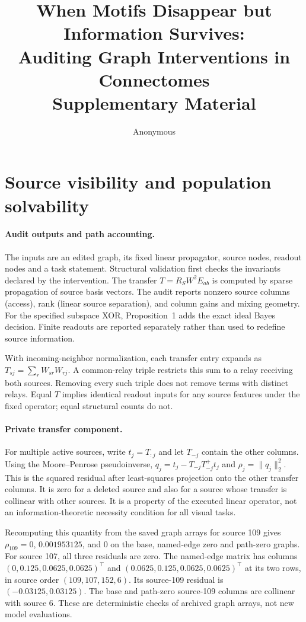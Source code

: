 \documentclass[10pt,letterpaper]{article}
\title{When Motifs Disappear but Information Survives:\\Auditing Graph Interventions in Connectomes\\\large Supplementary Material}
\author{Anonymous}
\date{}
\begin{document}
\maketitle

\section{Source visibility and population solvability}

\paragraph{Audit outputs and path accounting.}
The inputs are an edited graph, its fixed linear propagator, source nodes,
readout nodes and a task statement. Structural validation first checks the
invariants declared by the intervention. The transfer $T=R_SW^2E_{ab}$ is
computed by sparse propagation of source basis vectors. The audit reports
nonzero source columns (access), rank (linear source separation), and
column gains and mixing geometry. For the specified subspace XOR,
Proposition~1 adds the exact ideal Bayes decision. Finite readouts are
reported separately rather than used to redefine source information.

With incoming-neighbor normalization, each transfer entry expands as
$T_{sj}=\sum_r W_{sr}W_{rj}$. A common-relay triple restricts this sum
to a relay receiving both sources. Removing every such triple does not
remove terms with distinct relays. Equal $T$ implies identical readout
inputs for any source features under the fixed operator; equal structural
counts do not.

\paragraph{Private transfer component.}
For multiple active sources, write $t_j=T_{:j}$ and let $T_{-j}$ contain
the other columns. Using the Moore--Penrose pseudoinverse,
$q_j=t_j-T_{-j}T_{-j}^{+}t_j$ and $\rho_j=\|q_j\|_2^2$. This is the
squared residual after least-squares projection onto the other transfer
columns. It is zero for a deleted source and also for a source whose
transfer is collinear with other sources. It is a property of the
executed linear operator, not an information-theoretic necessity
condition for all visual tasks.

Recomputing this quantity from the saved graph arrays for source 109
gives $\rho_{109}=0$, $0.001953125$, and $0$ on the base, named-edge
zero and path-zero graphs. For source 107, all three residuals are zero.
The named-edge matrix has columns $(0,0.125,0.0625,0.0625)^\top$ and
$(0.0625,0.125,0.0625,0.0625)^\top$ at its two rows, in source order
$(109,107,152,6)$. Its source-109 residual is $(-0.03125,0.03125)$.
The base and path-zero source-109 columns are collinear with source 6.
These are deterministic checks of archived graph arrays, not new
model evaluations.
\end{document}
